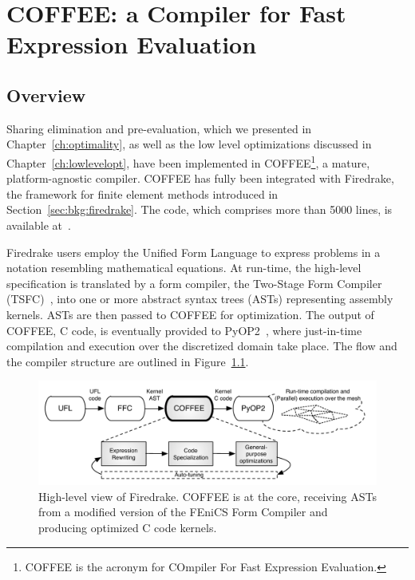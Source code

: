 \chapter{COFFEE: a Compiler for Fast Expression Evaluation}
\label{ch:coffee}

\section{Overview}
Sharing elimination and pre-evaluation, which we presented in Chapter~\ref{ch:optimality}, as well as the low level optimizations discussed in Chapter~\ref{ch:lowlevelopt}, have been implemented in COFFEE\footnote{COFFEE is the acronym for COmpiler For Fast Expression Evaluation.}, a mature, platform-agnostic compiler. COFFEE has fully been integrated with Firedrake, the framework for finite element methods introduced in Section~\ref{sec:bkg:firedrake}. The code, which comprises more than 5000 lines, is available at~\citep{coffee-code}.

Firedrake users employ the Unified Form Language to express problems in a notation resembling mathematical equations. At run-time, the high-level specification is translated by a form compiler, the Two-Stage Form Compiler (TSFC)~\cite{TSFC-Compiler}, into one or more abstract syntax trees (ASTs) representing assembly kernels. ASTs are then passed to COFFEE for optimization. The output of COFFEE, C code, is eventually provided to PyOP2~\citep{pyop2isc}, where just-in-time compilation and execution over the discretized domain take place. The flow and the compiler structure are outlined in Figure~\ref{fig:coffee-pipeline}. 

\begin{figure}
\begin{center}
\includegraphics[scale=0.70]{coffee/pictures/coffee-pipeline.pdf}
\caption{High-level view of Firedrake. COFFEE is at the core, receiving ASTs from a modified version of the FEniCS Form Compiler and producing optimized C code kernels.}
\label{fig:coffee-pipeline}
\end{center}
\end{figure}

